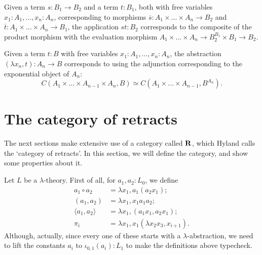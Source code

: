 Given a term $ s: B_1 \to B_2 $ and a term $ t: B_1 $, both with free variables $ x_1: A_1, \dots, x_n: A_n $, corresponding to morphisms $ \overline s: A_1 \times \dots \times A_n \to B_2 $ and $ \overline t: A_1 \times \dots \times A_n \to B_1 $, the application $ st: B_2 $ corresponds to the composite of the product morphism with the evaluation morphism $ A_1 \times \dots \times A_n \to B_2^{B_1} \times B_1 \to B_2 $.
\begin{center}
\end{center}

Given a term $ t: B $ with free variables $ x_1: A_1, \dots, x_n: A_n $, the abstraction $ (\lambda x_n, t): A_n \to B $ corresponds to using the adjunction corresponding to the exponential object of $ A_n $:
\[ C(A_1 \times \dots \times A_{n-1} \times A_n, B) \simeq C(A_1 \times \dots \times A_{n-1}, B^{A_n}). \]

\section{The category of retracts}\label{sec:retracts-category}

The next sections make extensive use of a category called $ \mathbf{R} $, which Hyland calls the `category of retracts'. In this section, we will define the category, and show some properties about it.

Let $ L $ be a $ \lambda $-theory. First of all, for $ a_1, a_2: L_0 $, we define
\begin{align*}
  a_1 \circ a_2 &= \lambda x_1, a_1 (a_2 x_1);\\
  (a_1, a_2) &= \lambda x_1, x_1 a_1 a_2;\\
  \langle a_1, a_2 \rangle &= \lambda x_1, (a_1 x_1, a_2 x_1);\\
  \pi_i &= \lambda x_1, x_1 (\lambda x_2 x_3, x_{i + 1}).
\end{align*}
Although, actually, since every one of these starts with a $ \lambda $-abstraction, we need to lift the constants $ a_i $ to $ \iota_{0, 1}(a_i): L_1 $ to make the definitions above typecheck.

